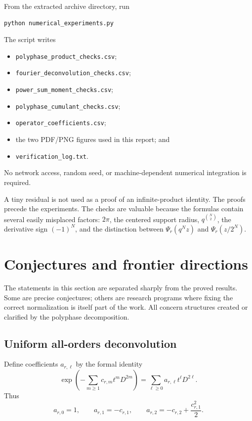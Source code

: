 \documentclass[11pt,oneside]{article}
\theoremstyle{definition}
\begin{document}
From the extracted archive directory, run
\begin{lstlisting}[style=python]
python numerical_experiments.py
\end{lstlisting}
The script writes
\begin{itemize}
\item \texttt{polyphase\_product\_checks.csv};
\item \texttt{fourier\_deconvolution\_checks.csv};
\item \texttt{power\_sum\_moment\_checks.csv};
\item \texttt{polyphase\_cumulant\_checks.csv};
\item \texttt{operator\_coefficients.csv};
\item the two PDF/PNG figures used in this report; and
\item \texttt{verification\_log.txt}.
\end{itemize}
No network access, random seed, or machine-dependent numerical integration is
required.

\begin{warning}
A tiny residual is not used as a proof of an infinite-product identity.  The
proofs precede the experiments.  The checks are valuable because the formulas
contain several easily misplaced factors: $2\pi$, the centered support radius,
$q^{\binom N2}$, the derivative sign $(-1)^N$, and the distinction between
$\Psi_r(q^Nz)$ and $\Psi_r(z/2^N)$.
\end{warning}

\section{Conjectures and frontier directions}
\label{p2:sec:frontiers}

The statements in this section are separated sharply from the proved results.
Some are precise conjectures; others are research programs where fixing the
correct normalization is itself part of the work.  All concern structures
created or clarified by the polyphase decomposition.

\subsection{Uniform all-orders deconvolution}

Define coefficients $a_{r,\ell}$ by the formal identity
\begin{equation}
 \exp\!\left(-\sum_{m\ge1}c_{r,m}t^mD^{2m}\right)
 =\sum_{\ell\ge0}a_{r,\ell}t^\ell D^{2\ell}.              \label{p2:eq:ar-ell-def}
\end{equation}
Thus
\begin{equation}
 a_{r,0}=1,
 \qquad a_{r,1}=-c_{r,1},
 \qquad a_{r,2}=-c_{r,2}+\frac{c_{r,1}^2}{2}.             \label{p2:eq:first-ar-ell}
\end{equation}
\end{document}
